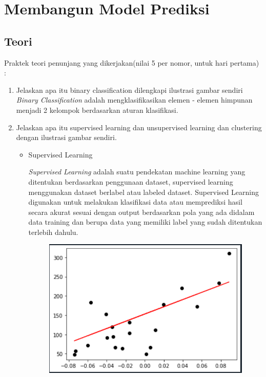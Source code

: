 \chapter{Membangun Model Prediksi}

\section{Teori}
Praktek teori penunjang yang dikerjakan(nilai 5 per nomor, untuk hari pertama) :
\begin{enumerate}
\item
Jelaskan apa itu binary classification dilengkapi ilustrasi gambar sendiri \\
\textit{Binary Classification} adalah mengklasifikasikan elemen - elemen himpunan menjadi 2 kelompok berdasarkan aturan klasifikasi.
\item
Jelaskan apa itu supervised learning dan unsupervised learning dan clustering dengan ilustrasi gambar sendiri. \\
\begin{itemize}
	\item Supervised Learning
	\par
		\textit{Supervised Learning} adalah suatu pendekatan machine learning yang ditentukan berdasarkan penggunaan dataset, supervised learning menggunakan dataset berlabel atau labeled dataset. Supervised Learning digunakan untuk melakukan klasifikasi data atau memprediksi hasil secara akurat sesuai dengan output berdasarkan pola yang ada didalam data training dan berupa data yang memiliki label yang sudah ditentukan terlebih dahulu. \\
		\begin{figure}[!htbp]
			\centering
			\includegraphics[scale=0.4]{figures/supervised-learning.PNG}

\end{figure}
\end{itemize}
\end{enumerate}
